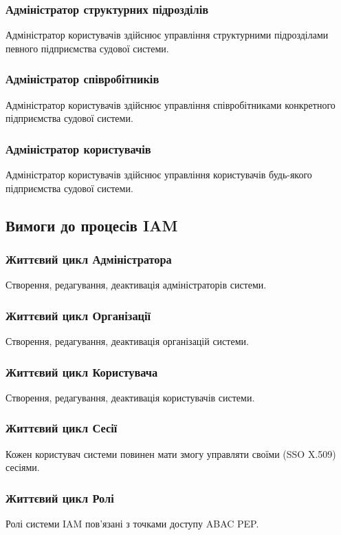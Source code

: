 \documentclass{article}
\begin{document}
\subsubsection{Адміністратор структурних підрозділів}
Адміністратор користувачів здійснює управління структурними підрозділами певного підприємства судової системи.

\subsubsection{Адміністратор співробітників}
Адміністратор користувачів здійснює управління співробітниками конкретного підприємства судової системи.

\subsubsection{Адміністратор користувачів}
Адміністратор користувачів здійснює управління користувачів будь-якого підприємства судової системи.

\newpage
\subsection{Вимоги до процесів IAM}

\subsubsection{Життєвий цикл Адміністратора}
Створення, редагування, деактивація адміністраторів системи.

\subsubsection{Життєвий цикл Організації}
Створення, редагування, деактивація організацій системи.

\subsubsection{Життєвий цикл Користувача}
Створення, редагування, деактивація користувачів системи.

\subsubsection{Життєвий цикл Сесії}
Кожен користувач системи повинен мати змогу управляти своїми (SSO X.509) сесіями.

\subsubsection{Життєвий цикл Ролі}
Ролі системи IAM пов'язані з точками доступу ABAC PEP.
\end{document}
